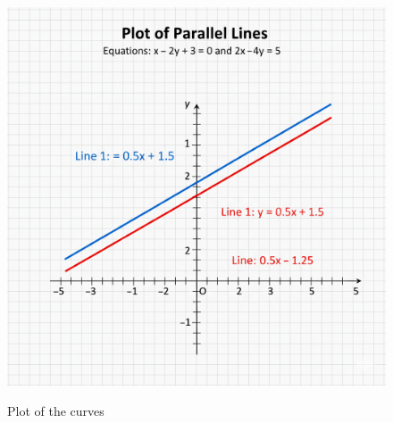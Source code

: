 \documentclass[journal]{IEEEtran}
\begin{document}
\begin{figure}[htbp]
\centering
\includegraphics[width=\columnwidth]{figs/python_plot.png} 
\caption*{Plot of the curves}
\label*{Fig1}
\end{figure}
\end{document}
